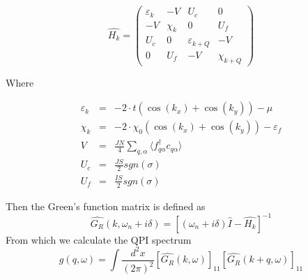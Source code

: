 \documentclass[11pt, oneside]{article}
\begin{document}
$$ \hat{H_k} = 
\left( \begin{array}{cccc}
\varepsilon _{k} & -V & U_{c} & 0 \\
-V & \chi _{k} & 0 & U_{f} \\
U_{c} & 0 & \varepsilon _{k+Q} & -V \\
0 & U_{f} & -V & \chi _{k+Q}
\end{array}\right) $$

Where

\begin{eqnarray*}
\varepsilon_k &=& -2 \cdot t (\cos(k_x) + \cos(k_y)) - \mu \\
\chi_k &=& -2 \cdot \chi_0 (\cos(k_x) + \cos(k_y)) - \varepsilon_f \\
V &=& \frac{J N}{4} \sum_{q,\alpha} \langle f_{q\alpha}^\dagger c_{q\alpha} \rangle \\
U_c &=& \frac{J S}{2} sgn(\sigma) \\
U_f &=& \frac{I S}{2} sgn(\sigma)
\end{eqnarray*}

Then the Green's function matrix is defined as
$$ \hat{G_R}(k,\omega_n+i\delta) = [(\omega_n+i\delta)\hat{I} - \hat{H_k}]^{-1} $$
From which we calculate the QPI spectrum
$$ g(q,\omega)=\int \frac{d^2x}{(2 \pi)^2} [\hat{G_R}(k,\omega)]_{11}[\hat{G_R}(k+q,\omega)]_{11} $$
\end{document}
